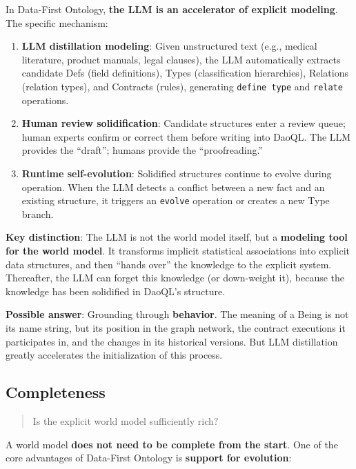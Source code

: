 \documentclass[11pt,a4paper]{article}
\begin{document}
In Data-First Ontology, \textbf{the LLM is an accelerator of explicit
modeling}. The specific mechanism:

\begin{enumerate}
\def\labelenumi{\arabic{enumi}.}
\item
  \textbf{LLM distillation modeling}: Given unstructured text (e.g.,
  medical literature, product manuals, legal clauses), the LLM
  automatically extracts candidate Defs (field definitions), Types
  (classification hierarchies), Relations (relation types), and
  Contracts (rules), generating \texttt{define\ type} and
  \texttt{relate} operations.
\item
  \textbf{Human review solidification}: Candidate structures enter a
  review queue; human experts confirm or correct them before writing
  into DaoQL. The LLM provides the ``draft''; humans provide the
  ``proofreading.''
\item
  \textbf{Runtime self-evolution}: Solidified structures continue to
  evolve during operation. When the LLM detects a conflict between a new
  fact and an existing structure, it triggers an \texttt{evolve}
  operation or creates a new Type branch.
\end{enumerate}

\textbf{Key distinction}: The LLM is not the world model itself, but a
\textbf{modeling tool for the world model}. It transforms implicit
statistical associations into explicit data structures, and then ``hands
over'' the knowledge to the explicit system. Thereafter, the LLM can
forget this knowledge (or down-weight it), because the knowledge has
been solidified in DaoQL's structure.

\textbf{Possible answer}: Grounding through \textbf{behavior}. The
meaning of a Being is not its name string, but its position in the graph
network, the contract executions it participates in, and the changes in
its historical versions. But LLM distillation greatly accelerates the
initialization of this process.

\subsection{Completeness}\label{completeness}

\begin{quote}
Is the explicit world model sufficiently rich?
\end{quote}

A world model \textbf{does not need to be complete from the start}. One
of the core advantages of Data-First Ontology is \textbf{support for
evolution}:
\end{document}

